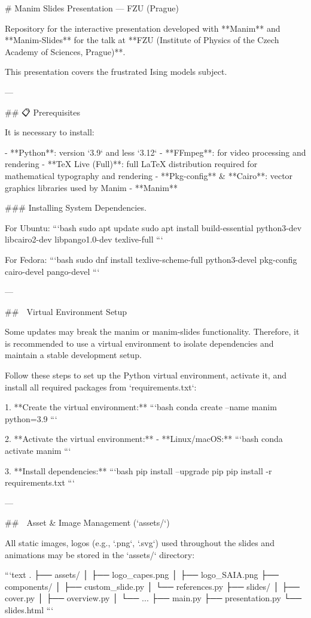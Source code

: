 # Manim Slides Presentation — FZU (Prague)

Repository for the interactive presentation developed with **Manim** and **Manim-Slides** for the talk at **FZU (Institute of Physics of the Czech Academy of Sciences, Prague)**.

This presentation covers the frustrated Ising models subject.

---

## 📋 Prerequisites

It is necessary to install:

- **Python**: version `3.9` and less `3.12`
- **FFmpeg**: for video processing and rendering
- **TeX Live (Full)**: full LaTeX distribution required for mathematical typography and rendering
- **Pkg-config** & **Cairo**: vector graphics libraries used by Manim
- **Manim**

### Installing System Dependencies.

For Ubuntu:
```bash
sudo apt update
sudo apt install build-essential python3-dev libcairo2-dev libpango1.0-dev texlive-full
```

For Fedora:
```bash
sudo dnf install texlive-scheme-full python3-devel pkg-config cairo-devel pango-devel
```

---

## 🚀 Virtual Environment Setup

Some updates may break the manim or manim-slides functionality. Therefore, it is recommended to use a virtual environment to isolate dependencies and maintain a stable development setup.

Follow these steps to set up the Python virtual environment, activate it, and install all required packages from `requirements.txt`:

1. **Create the virtual environment:**
   ```bash
   conda create --name manim python=3.9
   ```

2. **Activate the virtual environment:**
   - **Linux/macOS:**
     ```bash
     conda activate manim
     ```

3. **Install dependencies:**
   ```bash
   pip install --upgrade pip
   pip install -r requirements.txt
   ```

---

## 🎨 Asset & Image Management (`assets/`)

All static images, logos (e.g., `.png`, `.svg`) used throughout the slides and animations may be stored in the `assets/` directory:

```text
.
├── assets/
│   ├── logo_capes.png
│   ├── logo_SAIA.png
├── components/
│   ├── custom_slide.py
│   └── references.py
├── slides/
│   ├── cover.py
│   ├── overview.py
│   └── ...
├── main.py
├── presentation.py
└── slides.html
```

